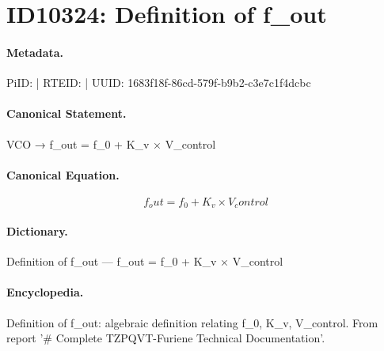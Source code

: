 \section*{ID10324: Definition of f\_out}
\paragraph{Metadata.}
PiID:  | RTEID:  | UUID: 1683f18f-86cd-579f-b9b2-c3e7c1f4dcbc

\paragraph{Canonical Statement.}
VCO → f\_out = f\_0 + K\_v × V\_control

\paragraph{Canonical Equation.}
\[
f_out = f_0 + K_v × V_control
\]

\paragraph{Dictionary.}
Definition of f\_out — f\_out = f\_0 + K\_v × V\_control

\paragraph{Encyclopedia.}
Definition of f\_out: algebraic definition relating f\_0, K\_v, V\_control. From report '\# Complete TZPQVT-Furiene Technical Documentation'.
